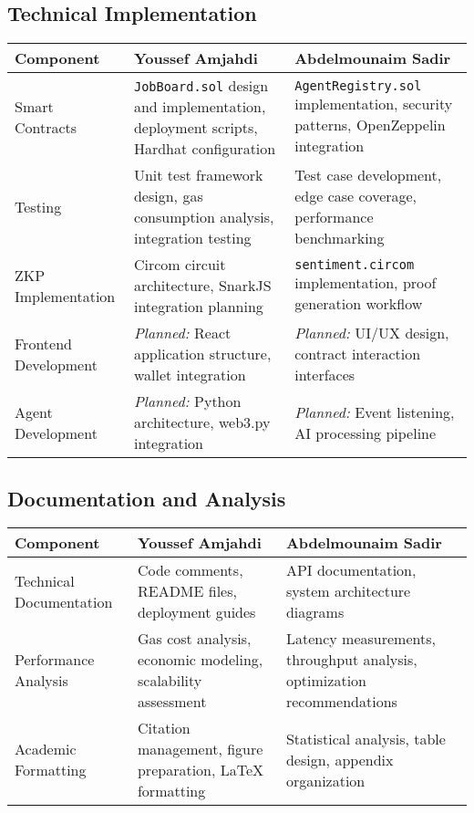 \subsection{Technical Implementation}
\begin{longtable}{p{}p{}p{}}
\toprule
\textbf{Component} & \textbf{Youssef Amjahdi} & \textbf{Abdelmounaim Sadir} \\
\midrule
Smart Contracts & \texttt{JobBoard.sol} design and implementation, deployment scripts, Hardhat configuration & \texttt{AgentRegistry.sol} implementation, security patterns, OpenZeppelin integration \\
Testing & Unit test framework design, gas consumption analysis, integration testing & Test case development, edge case coverage, performance benchmarking \\
ZKP Implementation & Circom circuit architecture, SnarkJS integration planning & \texttt{sentiment.circom} implementation, proof generation workflow \\
Frontend Development & \textit{Planned:} React application structure, wallet integration & \textit{Planned:} UI/UX design, contract interaction interfaces \\
Agent Development & \textit{Planned:} Python architecture, web3.py integration & \textit{Planned:} Event listening, AI processing pipeline \\
\bottomrule
\end{longtable}

\subsection{Documentation and Analysis}
\begin{longtable}{p{}p{}p{}}
\toprule
\textbf{Component} & \textbf{Youssef Amjahdi} & \textbf{Abdelmounaim Sadir} \\
\midrule
Technical Documentation & Code comments, README files, deployment guides & API documentation, system architecture diagrams \\
Performance Analysis & Gas cost analysis, economic modeling, scalability assessment & Latency measurements, throughput analysis, optimization recommendations \\
Academic Formatting & Citation management, figure preparation, LaTeX formatting & Statistical analysis, table design, appendix organization \\
\bottomrule
\end{longtable}

